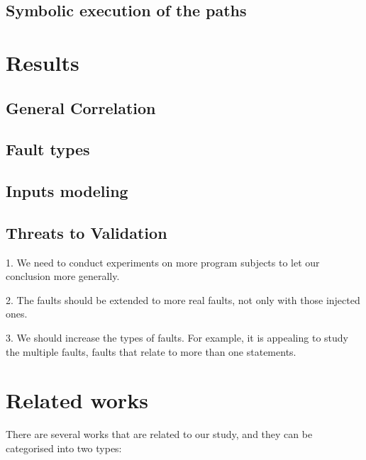 \documentclass{sig-alternate-05-2015}
\begin{document}
\subsection{Symbolic execution of the paths}



\section{Results}\label{sec:results}

\subsection{General Correlation}

\subsection{Fault types}

\subsection{Inputs modeling }


\subsection{Threats to Validation}


1. We need to conduct experiments on more program subjects to let our conclusion more generally.

2. The faults should be extended to more real faults, not only with those injected ones.

3. We should increase the types of faults. For example, it is appealing to study the multiple faults, faults that relate to more than one statements.

\section{Related works}\label{sec:related}

There are several works that are related to our study, and they can be categorised into two types:
\end{document}
